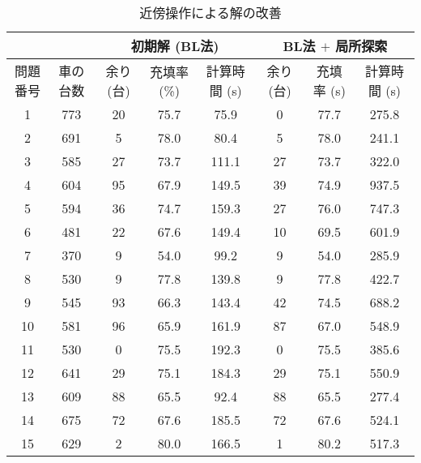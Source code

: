 \begin{table}[h]
        \centering
        \caption{近傍操作による解の改善}
        \label{review-local}
        \begin{tabular}{cccccccc}
        \hline
        & & \multicolumn{3}{c}{初期解 (BL法)} & \multicolumn{3}{c}{BL法 $+$ 局所探索} \\
        \hline
        問題番号 & 車の台数  & 余り (台)  & 充填率 (\%) & 計算時間 (s) & 余り (台)  & 充填率 (s)  & 計算時間 (s)  \\
        \hline
        1    & 773  & 20      & 75.7     & 75.9     & 0       &  77.7    & 275.8     \\
        2    & 691  & 5       & 78.0     & 80.4     & 5       &  78.0    & 241.1     \\
        3    & 585  & 27      & 73.7     & 111.1    & 27      &  73.7    & 322.0     \\
        4    & 604  & 95      & 67.9     & 149.5    & 39      &  74.9    & 937.5     \\
        5    & 594  & 36      & 74.7     & 159.3    & 27      &  76.0    & 747.3     \\
        6    & 481  & 22      & 67.6     & 149.4    & 10      &  69.5    & 601.9     \\
        7    & 370  & 9       & 54.0     & 99.2     & 9       &  54.0    & 285.9     \\
        8    & 530  & 9       & 77.8     & 139.8    & 9       &  77.8    & 422.7     \\
        9    & 545  & 93      & 66.3     & 143.4    & 42      &  74.5    & 688.2     \\
        10   & 581  & 96      & 65.9     & 161.9    & 87      &  67.0    & 548.9     \\
        11   & 530  & 0       & 75.5     & 192.3    & 0       &  75.5    & 385.6     \\
        12   & 641  & 29      & 75.1     & 184.3    & 29      &  75.1    & 550.9     \\
        13   & 609  & 88      & 65.5     & 92.4     & 88      &  65.5    & 277.4     \\
        14   & 675  & 72      & 67.6     & 185.5    & 72      &  67.6    & 524.1     \\
        15   & 629  & 2       & 80.0     & 166.5    & 1       &  80.2    & 517.3     \\
        \hline
        \end{tabular}
\end{table}


